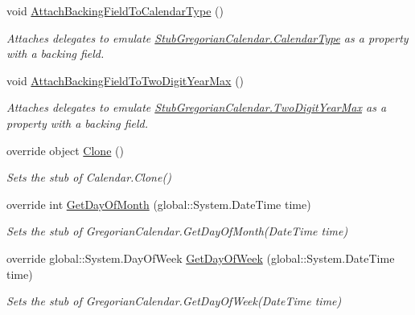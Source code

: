 \begin{DoxyCompactItemize}
void \hyperlink{class_system_1_1_globalization_1_1_fakes_1_1_stub_gregorian_calendar_a736e550d7b88979e626dae56d893cd12}{Attach\-Backing\-Field\-To\-Calendar\-Type} ()
\begin{DoxyCompactList}\small\item\em Attaches delegates to emulate \hyperlink{class_system_1_1_globalization_1_1_fakes_1_1_stub_gregorian_calendar_a00abf89d4e56f268ec2ac2ca6807b134}{Stub\-Gregorian\-Calendar.\-Calendar\-Type} as a property with a backing field.\end{DoxyCompactList}\item 
void \hyperlink{class_system_1_1_globalization_1_1_fakes_1_1_stub_gregorian_calendar_a76aa6b80a7e050b5013106892b1d825e}{Attach\-Backing\-Field\-To\-Two\-Digit\-Year\-Max} ()
\begin{DoxyCompactList}\small\item\em Attaches delegates to emulate \hyperlink{class_system_1_1_globalization_1_1_fakes_1_1_stub_gregorian_calendar_a8ea6155fe1afc7af1d26e372d51da0b7}{Stub\-Gregorian\-Calendar.\-Two\-Digit\-Year\-Max} as a property with a backing field.\end{DoxyCompactList}\item 
override object \hyperlink{class_system_1_1_globalization_1_1_fakes_1_1_stub_gregorian_calendar_a2b8b9484ec99804d8aca8b5bd8f69ddb}{Clone} ()
\begin{DoxyCompactList}\small\item\em Sets the stub of Calendar.\-Clone()\end{DoxyCompactList}\item 
override int \hyperlink{class_system_1_1_globalization_1_1_fakes_1_1_stub_gregorian_calendar_a816031486886126dc3a9b418df86757f}{Get\-Day\-Of\-Month} (global\-::\-System.\-Date\-Time time)
\begin{DoxyCompactList}\small\item\em Sets the stub of Gregorian\-Calendar.\-Get\-Day\-Of\-Month(\-Date\-Time time)\end{DoxyCompactList}\item 
override global\-::\-System.\-Day\-Of\-Week \hyperlink{class_system_1_1_globalization_1_1_fakes_1_1_stub_gregorian_calendar_ae1aa52e6fdbdefe86217ef94da0969ae}{Get\-Day\-Of\-Week} (global\-::\-System.\-Date\-Time time)
\begin{DoxyCompactList}\small\item\em Sets the stub of Gregorian\-Calendar.\-Get\-Day\-Of\-Week(\-Date\-Time time)\end{DoxyCompactList}\item 

\end{DoxyCompactItemize}
